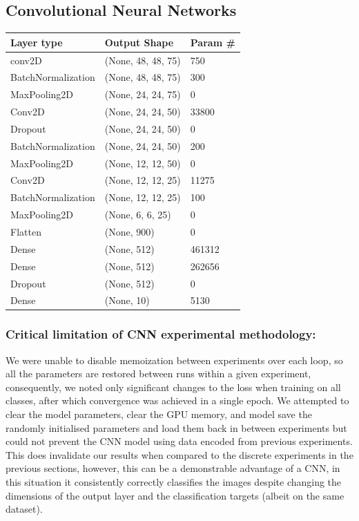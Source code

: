 \documentclass[11pt]{article}
\begin{document}


\newpage
\subsection{Convolutional Neural Networks}
\begin{center}
  

\begin{table}[h]
  \begin{tabular}{@{}lll@{}}
  \toprule
  Layer type & Output Shape & Param \# \\ \midrule
  conv2D & (None, 48, 48, 75) & 750 \\ \midrule
  BatchNormalization & (None, 48, 48, 75) & 300 \\ \midrule
  MaxPooling2D & (None, 24, 24, 75) & 0 \\ \midrule
  Conv2D & (None, 24, 24, 50) & 33800 \\ \midrule
  Dropout & (None, 24, 24, 50) & 0 \\ \midrule
  BatchNormalization & (None, 24, 24, 50) & 200 \\ \midrule
  MaxPooling2D & (None, 12, 12, 50) & 0 \\ \midrule
  Conv2D & (None, 12, 12, 25) & 11275 \\ \midrule
  BatchNormalization & (None, 12, 12, 25) & 100 \\ \midrule
  MaxPooling2D & (None, 6, 6, 25) & 0 \\ \midrule
  Flatten & (None, 900) & 0 \\ \midrule
  Dense & (None, 512) & 461312 \\ \midrule
  Dense & (None, 512) & 262656 \\ \midrule
  Dropout & (None, 512) & 0 \\ \midrule
  Dense & (None, 10) & 5130 \\ \bottomrule
  \end{tabular}
  \end{table}
 \end{center} 
\subsubsection{Critical limitation of CNN experimental methodology:}
We were unable to disable memoization between experiments over each loop, so all the parameters are restored between runs within a given experiment, consequently, we noted only significant changes to the loss when training on all classes, after which convergence was achieved in a single epoch. We attempted to clear the model parameters, clear the GPU memory, and model save the randomly initialised parameters and load them back in between experiments but could not prevent the CNN model using data encoded from previous experiments. This does invalidate our results when compared to the discrete experiments in the previous sections, however, this can be a demonstrable advantage of a CNN, in this situation it consistently correctly classifies the images despite changing the dimensions of the output layer and the classification targets (albeit on the same dataset).
\end{document}

